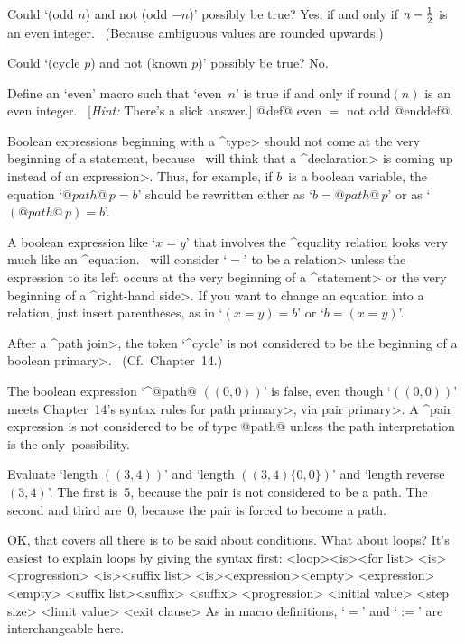 \dangerexercise Could `(odd $n$) and not (odd $-n$)' possibly be true?
\answer Yes, if and only if $n-{1\over2}$ is an even integer.
\ (Because ambiguous values are rounded upwards.)

\dangerexercise Could `(cycle $p$) and not (known $p$)' possibly be true?
\answer No.

\dangerexercise Define an `even' macro such that `even~$n$' is true if
and only if round$(n)$ is an even integer. \ [{\sl Hint:\/} There's a
slick answer.]
\answer @def@ even $=$ not odd @enddef@.

\ddanger Boolean expressions beginning with a ^\<type> should not come
at the very beginning of a statement, because \MF\ will think that
a ^\<declaration> is coming up instead of an \<expression>. Thus, for
example, if $b$~is a boolean variable, the equation `$@path@\,p=b$'
should be rewritten either as `$b=@path@\,p$' or as `$(@path@\,p)=b$'.

\ddanger A boolean expression like `$x=y$' that involves the ^{equality}
relation looks very much like an ^{equation}. \MF\ will consider `$=$'
to be a \<relation> unless the expression to its left occurs at the
very beginning of a ^\<statement> or the very beginning of a ^\<right-hand
side>. If you want to change an equation into a relation,
just insert parentheses, as in `$(x=y)=b$' or `$b=(x=y)$'.

\ddanger After a ^\<path join>, the token `^{cycle}' is not considered
to be the beginning of a \<boolean primary>. \ (Cf.\ Chapter~14.)

\ddanger The boolean expression `^@path@ $((0,0))$' is false, even
though `$((0,0))$' meets Chapter~14's syntax rules for
\<path primary>, via \<pair primary>.
A ^{pair expression} is not considered to be
of type @path@ unless the path interpretation is the only~possibility.

\ddangerexercise Evaluate `length $((3,4))$' and `length $((3,4)\{0,0\})$'
and `length reverse~$(3,4)$'.
\answer The first is~5, because the pair is not considered to be a path.
The second and third are~0, because the pair is forced to become a path.

OK, that covers all there is to be said about conditions. What about
loops? It's easiest to explain loops by giving the syntax first:
\beginsyntax
<loop><is><for list>
 <is><progression>
 <is><suffix list>
 \alt[forever]
<is>\is[=]\is<expression>\alt<empty>
 \alt<for list>[,]<expression><empty>
<suffix list>\is<suffix>
 <suffix>
<progression>
<initial value>
<step size>
<limit value>
<exit clause>
\endsyntax
As in macro definitions, `$=$' and `$:=$' are interchangeable here.

